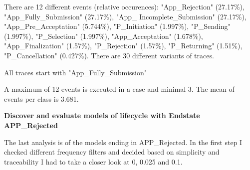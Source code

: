 There are 12 different events (relative occurences):
"App\_Rejection" (27.17\%), "App\_Fully\_Submission" (27.17\%), "App\_ Incomplete\_Submission" (27.17\%), "App\_Pre\_Acceptation" (5.744\%), "P\_Initiation" (1.997\%), "P\_Sending" (1.997\%), "P\_Selection" (1.997\%), "App\_Acceptation" (1.678\%), "App\_Finalization" (1.57\%), "P\_Rejection" (1.57\%), "P\_Returning" (1.51\%), "P\_Cancellation" (0.427\%). There are 30 different variants of traces.

All traces start with "App\_Fully\_Submission"

A maximum of 12 events is executed in a case and minimal 3. The mean of events per class is 3.681.


\textbf{Discover and evaluate models of lifecycle with Endstate APP\_Rejected}

The last analysis is of the models ending in APP\_Rejected. In the first step I checked different frequency filters and decided based on simplicity and traceability I had to take a closer look at 0, 0.025 and 0.1.

